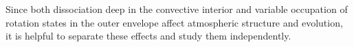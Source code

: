 \documentclass[apj]{emulateapj}
\begin{document}
Since both dissociation deep in the convective interior and variable occupation of rotation states in the outer envelope affect atmospheric structure and evolution, it is helpful to separate these effects and study them independently. 

%
%
%
%
%
%


\end{document}
